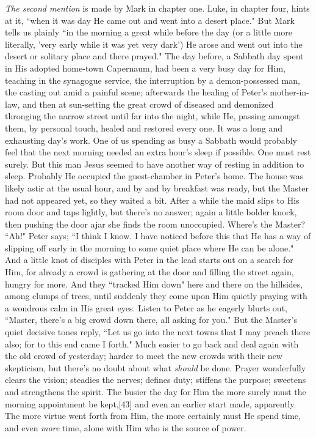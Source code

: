 \textit{The second mention} is made by Mark in chapter one. Luke, in chapter
four, hints at it, ``when it was day He came out and went into a desert
place." But Mark tells us plainly ``in the morning a great while before the
day (or a little more literally, 'very early while it was yet very dark')
He arose and went out into the desert or solitary place and there prayed."
The day before, a Sabbath day spent in His adopted home-town Capernaum,
had been a very busy day for Him, teaching in the synagogue service, the
interruption by a demon-possessed man, the casting out amid a painful
scene; afterwards the healing of Peter's mother-in-law, and then at
sun-setting the great crowd of diseased and demonized thronging the
narrow street until far into the night, while He, passing amongst them, by
personal touch, healed and restored every one. It was a long and
exhausting day's work. One of us spending as busy a Sabbath would probably
feel that the next morning needed an extra hour's sleep if possible. One
must rest surely. But this man Jesus seemed to have another way of resting
in addition to sleep. Probably He occupied the guest-chamber in Peter's
home. The house was likely astir at the usual hour, and by and by
breakfast was ready, but the Master had not appeared yet, so they waited a
bit. After a while the maid slips to His room door and taps lightly, but
there's no answer; again a little bolder knock, then pushing the door ajar
she finds the room unoccupied. Where's the Master? ``Ah!" Peter says; ``I
think I know. I have noticed before this that He has a way of slipping off
early in the morning to some quiet place where He can be alone." And a
little knot of disciples with Peter in the lead starts out on a search for
Him, for already a crowd is gathering at the door and filling the street
again, hungry for more. And they ``tracked Him down" here and there on the
hillsides, among clumps of trees, until suddenly they come upon Him
quietly praying with a wondrous calm in His great eyes. Listen to Peter as
he eagerly blurts out, ``Master, there's a big crowd down there, all asking
for you." But the Master's quiet decisive tones reply, ``Let us go into
the next towns that I may preach there also; for to this end came I
forth." Much easier to go back and deal again with the old crowd of
yesterday; harder to meet the new crowds with their new skepticism, but
there's no doubt about what \textit{should} be done. Prayer wonderfully clears
the vision; steadies the nerves; defines duty; stiffens the purpose;
sweetens and strengthens the spirit. The busier the day for Him the more
surely must the morning appointment be kept,[43] and even an earlier start
made, apparently. The more virtue went forth from Him, the more certainly
must He spend time, and even \textit{more} time, alone with Him who is the source
of power.

